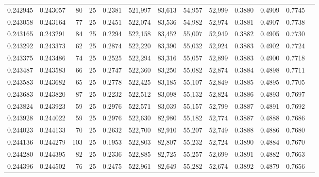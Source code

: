 \begin{tabular}{rrrrrrrrrrrrr}
0.242945 & 0.243057 &    80 &  25 &                                     0.2381 & 521,997 &  83,613 &  54,957 &  52,999 & 0.3880 & 0.4909 & 0.7745 \\
0.243058 & 0.243164 &    77 &  25 &                                     0.2451 & 522,074 &  83,536 &  54,982 &  52,974 & 0.3881 & 0.4907 & 0.7738 \\
0.243165 & 0.243291 &    84 &  25 &                                     0.2294 & 522,158 &  83,452 &  55,007 &  52,949 & 0.3882 & 0.4905 & 0.7730 \\
0.243292 & 0.243373 &    62 &  25 &                                     0.2874 & 522,220 &  83,390 &  55,032 &  52,924 & 0.3883 & 0.4902 & 0.7724 \\
0.243375 & 0.243486 &    74 &  25 &                                     0.2525 & 522,294 &  83,316 &  55,057 &  52,899 & 0.3883 & 0.4900 & 0.7718 \\
0.243487 & 0.243583 &    66 &  25 &                                     0.2747 & 522,360 &  83,250 &  55,082 &  52,874 & 0.3884 & 0.4898 & 0.7711 \\
0.243583 & 0.243682 &    65 &  25 &                                     0.2778 & 522,425 &  83,185 &  55,107 &  52,849 & 0.3885 & 0.4895 & 0.7705 \\
0.243683 & 0.243820 &    87 &  25 &                                     0.2232 & 522,512 &  83,098 &  55,132 &  52,824 & 0.3886 & 0.4893 & 0.7697 \\
0.243824 & 0.243923 &    59 &  25 &                                     0.2976 & 522,571 &  83,039 &  55,157 &  52,799 & 0.3887 & 0.4891 & 0.7692 \\
0.243928 & 0.244022 &    59 &  25 &                                     0.2976 & 522,630 &  82,980 &  55,182 &  52,774 & 0.3887 & 0.4888 & 0.7686 \\
0.244023 & 0.244133 &    70 &  25 &                                     0.2632 & 522,700 &  82,910 &  55,207 &  52,749 & 0.3888 & 0.4886 & 0.7680 \\
0.244136 & 0.244279 &   103 &  25 &                                     0.1953 & 522,803 &  82,807 &  55,232 &  52,724 & 0.3890 & 0.4884 & 0.7670 \\
0.244280 & 0.244395 &    82 &  25 &                                     0.2336 & 522,885 &  82,725 &  55,257 &  52,699 & 0.3891 & 0.4882 & 0.7663 \\
0.244396 & 0.244502 &    76 &  25 &                                     0.2475 & 522,961 &  82,649 &  55,282 &  52,674 & 0.3892 & 0.4879 & 0.7656 \\

\end{tabular}
